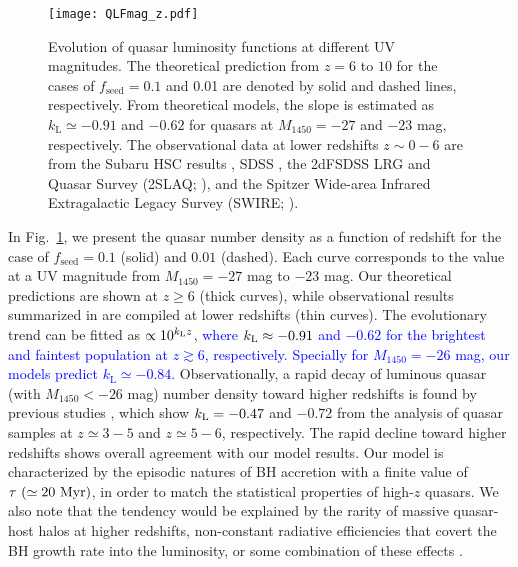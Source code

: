 \documentclass[twocolumn, twocolappendix]{aastex63}
\newcommand{\fseed}{f_\mathrm{seed}}
\newcommand{\Muv}{M_{1450}}
\newcommand{\blue}[1]{\textcolor{blue}{ #1}}
\begin{document}
\begin{CJK*}{UTF8}{gbsn}
\begin{figure}
\centering
\texttt{[image: QLFmag\_z.pdf]}
\caption{
Evolution of quasar luminosity functions at different UV magnitudes.
The theoretical prediction from $z=6$ to $10$ for the cases of $\fseed=0.1$ and 0.01 are denoted by solid and dashed lines, respectively.
From theoretical models, the slope is estimated as $k_\mathrm{L} \simeq -0.91$ and $-0.62$ for quasars at $\Muv=-27$ and $-23$ mag, respectively.
The observational data at lower redshifts $z\sim 0-6$ are from the Subaru HSC results \citep{2018PASJ...70S..34A,2018ApJ...869..150M,2020ApJ...904...89N},
SDSS \citep{2006AJ....131.2766R,2013ApJ...768..105M},
the 2dFSDSS LRG and Quasar Survey (2SLAQ; \citealt{2009MNRAS.399.1755C}),
and the Spitzer Wide-area Infrared Extragalactic Legacy Survey (SWIRE; \citealt{2008ApJ...675...49S}).
}
\label{fig:QLFmag_z}
\vspace{5mm}
\end{figure}


In Fig.~\ref{fig:QLFmag_z}, we present the quasar number density as a function of redshift for 
the case of $\fseed =0.1$ (solid) and $0.01$ (dashed).
Each curve corresponds to the value at a UV magnitude from $\Muv=-27$ mag to $-23$ mag.
Our theoretical predictions are shown at $z\geq 6$ (thick curves),
while observational results summarized in \cite{2020ApJ...904...89N} are compiled at lower redshifts (thin curves).
The evolutionary trend can be fitted as $\propto 10^{k_{\rm L}z}$,
\blue{
where $k_{\rm L}\approx -0.91$ and $-0.62$ for the brightest and faintest population
at $z\gtrsim 6$, respectively.
Specially for $\Muv=-26$ mag, our models predict $k_\mathrm{L} \simeq -0.84$.
}
Observationally, a rapid decay of luminous quasar (with $\Muv<-26$ mag) number density toward higher redshifts is found by previous studies
\citep[e.g.,][]{2001AJ....122.2833F,2013ApJ...768..105M,2016ApJ...833..222J,2019ApJ...884...30W},
which show $k_{\rm L}= -0.47$ and $-0.72$ from the analysis of quasar samples at $z\simeq 3-5$ and $z\simeq 5-6$, respectively.
The rapid decline toward higher redshifts shows overall agreement with our model results.
Our model is characterized by the episodic natures of BH accretion with a finite value of
$\tau ~(\simeq 20~{\rm Myr})$, in order to match the statistical properties of high-$z$ quasars.
We also note that the tendency would be explained by the rarity of massive quasar-host halos at higher redshifts,
non-constant radiative efficiencies that covert the BH growth rate into the luminosity, or some combination of these effects
\citep[e.g.,][]{2010ApJ...718..231S}.


\end{CJK*}
\end{document}
